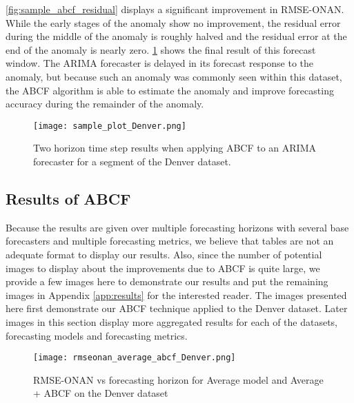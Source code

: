 \ref{fig:sample_abcf_residual} displays a significant improvement in RMSE-ONAN.  While the early stages of the anomaly show no improvement, the residual error during the middle of the anomaly is roughly halved and the residual error at the end of the anomaly is nearly zero.  \ref{fig:sample_abcf_denver} shows the final result of this forecast window.  The ARIMA forecaster is delayed in its forecast response to the anomaly, but because such an anomaly was commonly seen within this dataset, the ABCF algorithm is able to estimate the anomaly and improve forecasting accuracy during the remainder of the anomaly.

\begin{figure}[!h]
	\begin{center}
		\texttt{[image: sample\_plot\_Denver.png]}
	\end{center}
	\caption{Two horizon time step results when applying ABCF to an ARIMA forecaster for a segment of the Denver dataset.}
	\label{fig:sample_abcf_denver}
\end{figure}


\subsection{Results of ABCF}
Because the results are given over multiple forecasting horizons with several base forecasters and multiple forecasting metrics, we believe that tables are not an adequate format to display our results.  Also, since the number of potential images to display about the improvements due to ABCF is quite large, we provide a few images here to demonstrate our results and put the remaining images in Appendix \ref{app:results} for the interested reader.  The images presented here first demonstrate our ABCF technique applied to the Denver dataset.  Later images in this section display more aggregated results for each of the datasets, forecasting models and forecasting metrics.

\begin{figure}[!b]
	\begin{center}
		\texttt{[image: rmseonan\_average\_abcf\_Denver.png]}
	\end{center}
	\caption{RMSE-ONAN vs forecasting horizon for Average model and Average + ABCF on the Denver dataset}
	\label{fig:average_abcf_rmseonan_denver}
\end{figure}

